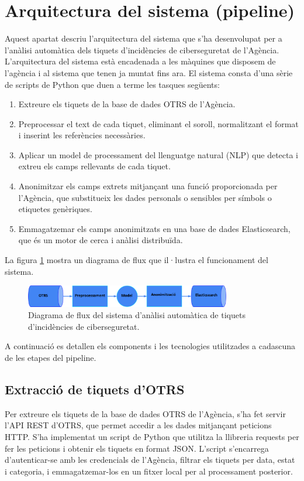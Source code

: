 \section{Arquitectura del sistema (pipeline)}
Aquest apartat descriu l'arquitectura del sistema que s'ha desenvolupat per a l'anàlisi automàtica dels tiquets d'incidències de ciberseguretat de l'Agència. L'arquitectura del sistema està encadenada a les màquines que disposem de l'agència i al sistema que tenen ja muntat fins ara. El sistema consta d'una sèrie de scripts de Python que duen a terme les tasques següents:

\begin{enumerate}
     \item Extreure els tiquets de la base de dades OTRS de l'Agència.
     \item Preprocessar el text de cada tiquet, eliminant el soroll, normalitzant el format i inserint les referències necessàries.
     \item Aplicar un model de processament del llenguatge natural (NLP) que detecta i extreu els camps rellevants de cada tiquet.
     \item Anonimitzar els camps extrets mitjançant una funció proporcionada per l'Agència, que substitueix les dades personals o sensibles per símbols o etiquetes genèriques.
     \item Emmagatzemar els camps anonimitzats en una base de dades Elasticsearch, que és un motor de cerca i anàlisi distribuïda.
\end{enumerate}

La figura \ref{fig:pipeline} mostra un diagrama de flux que il·lustra el funcionament del sistema.

\begin{figure}[h]
     \centering
     \includegraphics[width=0.8\textwidth]{pipeline.png}
     \caption{Diagrama de flux del sistema d'anàlisi automàtica de tiquets d'incidències de ciberseguretat.}
     \label{fig:pipeline}
\end{figure}

A continuació es detallen els components i les tecnologies utilitzades a cadascuna de les etapes del pipeline.
\subsection{Extracció de tiquets d'OTRS}
Per extreure els tiquets de la base de dades OTRS de l'Agència, s'ha fet servir l'API REST d'OTRS, que permet accedir a les dades mitjançant peticions HTTP. S'ha implementat un script de Python que utilitza la llibreria requests per fer les peticions i obtenir els tiquets en format JSON. L'script s'encarrega d'autenticar-se amb les credencials de l'Agència, filtrar els tiquets per data, estat i categoria, i emmagatzemar-los en un fitxer local per al processament posterior.

